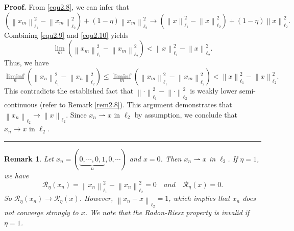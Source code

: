\documentclass[a4paper,12pt]{article}
\newtheorem{remark}[theorem]{Remark}
\numberwithin{equation}{section}
\newenvironment{proof}[1][Proof]{\textbf{#1.} }
{\ \rule{0.75em}{0.75em}\smallskip}
\begin{document}
\begin{proof}
    From \eqref{equ2.8}, we can infer that
    \begin{equation}\label{equ2.10}
        \left(\left\|x_{m}\right\|_{\ell_{1}}^{2}-\left\|x_{m}\right\|_{\ell_{2}}^{2} \right)+\left(1-\eta\right)\left\|x_{m}\right\|_{\ell_{2}}^{2} \rightarrow \left(\left\|x\right\|_{\ell_{1}}^{2}-\left\|x\right\|_{\ell_{2}}^{2} \right)+\left(1-\eta\right)\left\|x\right\|_{\ell_{2}}^{2}.
    \end{equation}
    Combining \eqref{equ2.9} and \eqref{equ2.10} yields
    \begin{equation*}
        \lim_{m}\left(\left\|x_{m}\right\|_{\ell_{1}}^{2}-\left\|x_{m}\right\|_{\ell_{2}}^{2} \right)<\left\|x\right\|_{\ell_{1}}^{2}-\left\|x\right\|_{\ell_{2}}^{2}.
    \end{equation*}
    Thus, we have
    \begin{equation}\label{equ2.11}
        \liminf_{n}\left(\left\|x_{n}\right\|_{\ell_{1}}^{2}-\left\|x_{n}\right\|_{\ell_{2}}^{2} \right) \leq
        \liminf_{m}\left(\left\|x_{m}\right\|_{\ell_{1}}^{2}-\left\|x_{m}\right\|_{\ell_{2}}^{2} \right)<\left\|x\right\|_{\ell_{1}}^{2}-\left\|x\right\|_{\ell_{2}}^{2}.
    \end{equation}
    This contradicts the established fact that $\left\|\cdot\right\|_{\ell_{1}}^{2}- \left\|\cdot\right\|_{\ell_{2}}^{2}$ is weakly lower semi-continuous (refer to Remark \ref{rem2.8}). This argument demonstrates that $\left\|x_{n}\right\|_{\ell_{2}} \rightarrow\left\|x\right\|_{\ell_{2}}$. Since $x_{n}\rightharpoonup x$ in $\ell_{2}$ by assumption, we conclude that $x_{n}\rightarrow x$ in $\ell_{2}$.
\end{proof}

\begin{remark}\label{rem2.10}
     Let $x_{n}=(\underbrace{0,\cdots,0,1}_{n},0,\cdots)$ and $x=0$. Then $x_{n}\rightharpoonup x$ in $\ell_{2}$. If $\eta=1$, we have
    \begin{equation*}
        \mathcal{R}_{\eta}\left(x_{n}\right)=\left\|x_{n}\right\|_{\ell_{1}}^{2}- \left\|x_{n}\right\|_{\ell_{2}}^{2}=0 \quad and \quad \mathcal{R}_{\eta}\left(x\right)=0.
    \end{equation*}
    So $\mathcal{R}_{\eta}\left(x_{n}\right)\rightarrow \mathcal{R}_{\eta}\left(x\right)$. However, $\left\|x_{n}-x\right\|_{\ell_{2}}=1$, which implies that $x_{n}$ does not converge strongly to $x$. We note that the Radon-Riesz property is invalid if $\eta=1$.
\end{remark}
\end{document}
